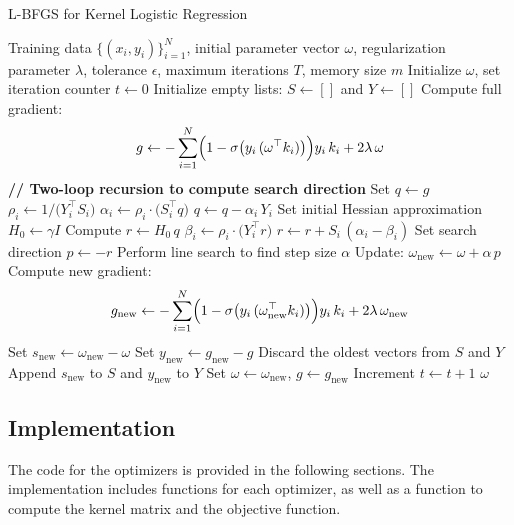 \documentclass{article}
\begin{document}
\begin{algorithm}[H]
  \caption{L-BFGS for Kernel Logistic Regression}
  \begin{algorithmic}[1]
  \Require Training data $\{(x_i, y_i)\}_{i=1}^{N}$, initial parameter vector $\omega$, regularization parameter $\lambda$, tolerance $\epsilon$, maximum iterations $T$, memory size $m$
  \State Initialize $\omega$, set iteration counter $t \gets 0$
  \State Initialize empty lists: $S \gets []$ and $Y \gets []$ 
  \Repeat
      \State Compute full gradient:
      \[
        g \gets -\sum_{i=1}^{N}\Bigl(1-\sigma\bigl(y_i\,(\omega^\top k_i)\bigr)\Bigr)y_i\,k_i + 2\lambda\,\omega
      \]
      \State \textbf{// Two-loop recursion to compute search direction}
      \State Set $q \gets g$
       
          \State $\rho_i \gets 1 / \bigl(Y_i^\top S_i\bigr)$
          \State $\alpha_i \gets \rho_i \cdot \bigl(S_i^\top q\bigr)$
          \State $q \gets q - \alpha_i\,Y_i$
      \EndFor
      \State Set initial Hessian approximation $H_0 \gets \gamma I$ 
      \State Compute $r \gets H_0\, q$
       
          \State $\beta_i \gets \rho_i \cdot \bigl(Y_i^\top r\bigr)$
          \State $r \gets r + S_i\,(\alpha_i - \beta_i)$
      \EndFor
      \State Set search direction $p \gets -r$
      \State Perform line search to find step size $\alpha$
      \State Update: $\omega_{\text{new}} \gets \omega + \alpha\, p$
      \State Compute new gradient:
      \[
        g_{\text{new}} \gets -\sum_{i=1}^{N}\Bigl(1-\sigma\bigl(y_i\,(\omega_{\text{new}}^\top k_i)\bigr)\Bigr)y_i\,k_i + 2\lambda\,\omega_{\text{new}}
      \]
      \State Set $s_{\text{new}} \gets \omega_{\text{new}} - \omega$
      \State Set $y_{\text{new}} \gets g_{\text{new}} - g$
          \State Discard the oldest vectors from $S$ and $Y$
      \EndIf
      \State Append $s_{\text{new}}$ to $S$ and $y_{\text{new}}$ to $Y$
      \State Set $\omega \gets \omega_{\text{new}}$, $g \gets g_{\text{new}}$
      \State Increment $t \gets t + 1$
  \State \Return $\omega$
  \end{algorithmic}
\end{algorithm}

\subsection*{Implementation}
The code for the optimizers is provided in the following sections. The implementation includes functions for each optimizer, as well as a function to compute the kernel matrix and the objective function.
\end{document}
